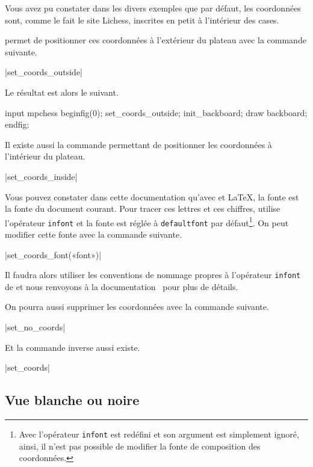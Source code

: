\documentclass[french]{ltxdoc}
\begin{document}
Vous avez pu constater dans les divers exemples que par défaut, les coordonnées
sont, comme le fait le site Lichess, inscrites en petit à l’intérieur des
cases.

\mpchess permet de positionner ces coordonnées à l’extérieur du plateau avec la commande suivante.

\commande|set_coords_outside|\smallskip

Le résultat est alors le suivant.

\begin{ExempleMP}
input mpchess
beginfig(0);
set_coords_outside;
init_backboard;
draw backboard;
endfig;
\end{ExempleMP}

Il existe aussi la commande permettant de positionner les coordonnées à l’intérieur du plateau.

\commande|set_coords_inside|\smallskip

Vous pouvez constater dans cette documentation qu’avec  et
\LaTeX, la fonte est la fonte du document courant. Pour tracer ces lettres et
ces chiffres, \mpchess utilise l’opérateur \MP{} \lstinline+infont+ et la fonte
est réglée à \lstinline+defaultfont+ par défaut\footnote{Avec 
l’opérateur \lstinline+infont+ est redéfini et son argument est simplement
ignoré, ainsi, il n’est pas possible de modifier la fonte de composition des
coordonnées.}. On peut modifier cette fonte avec la commande suivante.

\commande|set_coords_font(«font»)|\smallskip

Il faudra alors utiliser les conventions de nommage propres à l’opérateur
\lstinline+infont+ de \MP{} et nous renvoyons à la
documentation~\cite{ctan-metapost} pour plus de détails.

On pourra aussi supprimer les coordonnées avec la commande suivante.

\commande|set_no_coords|\smallskip

Et la commande inverse aussi existe.

\commande|set_coords|\smallskip


\subsection{Vue blanche ou noire}
\end{document}
